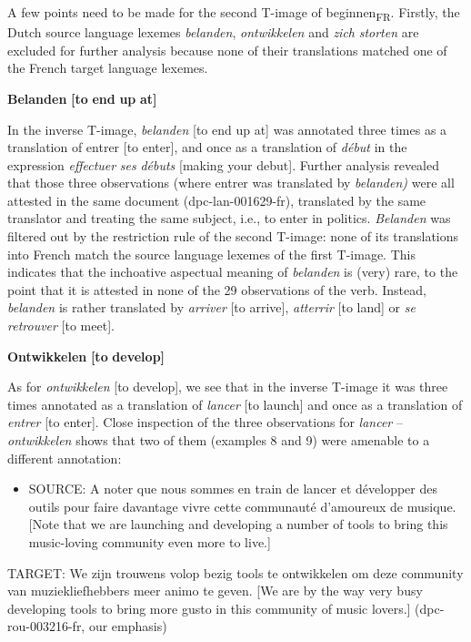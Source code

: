 A few points need to be made for the second T-image of beginnen\textsubscript{FR}. Firstly, the Dutch source language lexemes \textit{belanden}, \textit{ontwikkelen} and \textit{zich} \textit{storten} are excluded for further analysis because none of their translations matched one of the French target language lexemes.



\textbf{Belanden} \textbf{[to} \textbf{end} \textbf{up} \textbf{at]}



In the inverse T-image, \textit{belanden} [to end up at] was annotated three times as a translation of entrer [to enter], and once as a translation of \textit{début} in the expression \textit{effectuer} \textit{ses} \textit{débuts} [making your debut]. Further analysis revealed that those three observations (where entrer was translated by \textit{belanden)} were all attested in the same document (dpc-lan-001629-fr), translated by the same translator and treating the same subject, i.e., to enter in politics. \textit{Belanden} was filtered out by the restriction rule of the second T-image: none of its translations into French match the source language lexemes of the first T-image. This indicates that the inchoative aspectual meaning of \textit{belanden} is (very) rare, to the point that it is attested in none of the 29 observations of the verb. Instead, \textit{belanden} is rather translated by \textit{arriver} [to arrive], \textit{atterrir} [to land] or \textit{se} \textit{retrouver} [to meet].



\textbf{Ontwikkelen} \textbf{[to} \textbf{develop]}



As for \textit{ontwikkelen} [to develop], we see that in the inverse T-image it was three times annotated as a translation of \textit{lancer} [to launch] and once as a translation of \textit{entrer} [to enter]. Close inspection of the three observations for \textit{lancer} –\textit{ontwikkelen} shows that two of them (examples 8 and 9) were amenable to a different annotation:


\begin{itemize}
\item \begin{styleVoorbeeld}
SOURCE: A noter que nous sommes en train de lancer et développer des outils pour faire davantage vivre cette communauté d'amoureux de musique. [Note that we are launching and developing a number of tools to bring this music-loving community even more to live.]
\end{styleVoorbeeld}\end{itemize}
\begin{styleVoorbeeld}
TARGET: We zijn trouwens volop bezig tools te ontwikkelen om deze community van muziekliefhebbers meer animo te geven. [We are by the way very busy developing tools to bring more gusto in this community of music lovers.] (dpc-rou-003216-fr, our emphasis)
\end{styleVoorbeeld}

